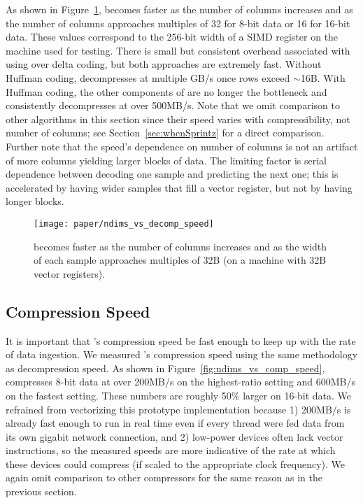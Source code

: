 As shown in Figure~\ref{fig:ndims_vs_decomp_speed}, \minesp becomes faster as the number of columns increases and as the number of columns approaches multiples of 32 for 8-bit data or 16 for 16-bit data. These values correspond to the 256-bit width of a SIMD register on the machine used for testing. There is small but consistent overhead associated with using \fire over delta coding, but both approaches are extremely fast. Without Huffman coding, \minesp decompresses at multiple GB/s once rows exceed $\sim$16B. With Huffman coding, the other components of \minesp are no longer the bottleneck and \minesp consistently decompresses at over 500MB/s. Note that we omit comparison to other algorithms in this section since their speed varies with compressibility, not number of columns; see Section~\ref{sec:whenSprintz} for a direct comparison. Further note that the speed's dependence on number of columns is not an artifact of more columns yielding larger blocks of data. The limiting factor is serial dependence between decoding one sample and predicting the next one; this is accelerated by having wider samples that fill a vector register, but not by having longer blocks.

\begin{figure}[h]
\begin{center}
    \texttt{[image: paper/ndims\_vs\_decomp\_speed]}
    \caption{\minesp becomes faster as the number of columns increases and as the width of each sample approaches multiples of 32B (on a machine with 32B vector registers). }
    \label{fig:ndims_vs_decomp_speed}
\end{center}
\end{figure}


\subsection{Compression Speed} \label{sec:comp_speed}

It is important that \mine's compression speed be fast enough to keep up with the rate of data ingestion. We measured \mine's compression speed using the same methodology as decompression speed. As shown in Figure~\ref{fig:ndims_vs_comp_speed}, \mine \text{} compresses 8-bit data at over 200MB/s on the highest-ratio setting and 600MB/s on the fastest setting. These numbers are roughly 50\% larger on 16-bit data. We refrained from vectorizing this prototype implementation because 1) 200MB/s is already fast enough to run in real time even if every thread were fed data from its own gigabit network connection, and 2) low-power devices often lack vector instructions, so the measured speeds are more indicative of the rate at which these devices could compress (if scaled to the appropriate clock frequency). We again omit comparison to other compressors for the same reason as in the previous section.

